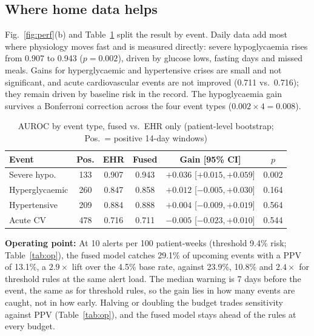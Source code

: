 \documentclass[conference]{IEEEtran}
\begin{document}
\subsection{Where home data helps} Fig.~\ref{fig:perf}(b) and Table~\ref{tab:events} split the result by event. Daily data add most where physiology moves fast and is measured directly: severe hypoglycaemia rises from 0.907 to 0.943 ($p=0.002$), driven by glucose lows, fasting days and missed meals. Gains for hyperglycaemic and hypertensive crises are small and not significant, and acute cardiovascular events are not improved (0.711 vs.\ 0.716); they remain driven by baseline risk in the record. The hypoglycaemia gain survives a Bonferroni correction across the four event types ($0.002\times4=0.008$).

\begin{table}[H]
\caption{AUROC by event type, fused vs.\ EHR only (patient-level bootstrap; Pos.\ = positive 14-day windows)}
\label{tab:events}
\centering
\footnotesize
\setlength{\tabcolsep}{3pt}
\begin{tabular}{@{}lccccc@{}}
\toprule
Event & Pos. & EHR & Fused & Gain [95\% CI] & $p$\\
\midrule
Severe hypo. & 133 & 0.907 & 0.943 & $+0.036$ [$+0.015,+0.059$] & 0.002\\
Hyperglycaemic & 260 & 0.847 & 0.858 & $+0.012$ [$-0.005,+0.030$] & 0.164\\
Hypertensive & 209 & 0.884 & 0.888 & $+0.004$ [$-0.009,+0.019$] & 0.564\\
Acute CV & 478 & 0.716 & 0.711 & $-0.005$ [$-0.023,+0.010$] & 0.544\\
\bottomrule
\end{tabular}
\end{table}

\textbf{Operating point:} At 10 alerts per 100 patient-weeks (threshold 9.4\% risk; Table~\ref{tab:op}), the fused model catches 29.1\% of upcoming events with a PPV of 13.1\%, a $2.9\times$ lift over the 4.5\% base rate, against 23.9\%, 10.8\% and $2.4\times$ for threshold rules at the same alert load. The median warning is 7 days before the event, the same as for threshold rules, so the gain lies in how many events are caught, not in how early. Halving or doubling the budget trades sensitivity against PPV (Table~\ref{tab:op}), and the fused model stays ahead of the rules at every budget.
\end{document}
